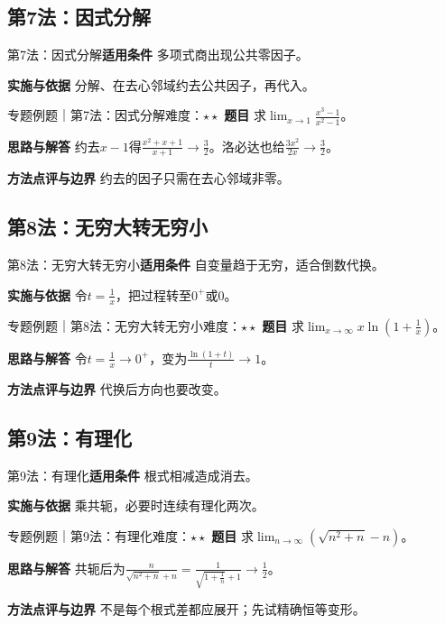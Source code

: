\subsection{第7法：因式分解}\label{mat:limits_35:k07}
\begin{method}{第7法：因式分解}\textbf{适用条件} 多项式商出现公共零因子。\par\textbf{实施与依据} 分解、在去心邻域约去公共因子，再代入。\end{method}
\begin{example}{专题例题｜第7法：因式分解}{难度：$\star\star$}
\textbf{题目} 求$\lim_{x\to1}\frac{x^3-1}{x^2-1}$。\par\textbf{思路与解答} 约去$x-1$得$\frac{x^2+x+1}{x+1}\to\frac{3}{2}$。洛必达也给$\frac{3x^2}{2x}\to\frac{3}{2}$。\par\textbf{方法点评与边界} 约去的因子只需在去心邻域非零。
\end{example}
\subsection{第8法：无穷大转无穷小}\label{mat:limits_35:k08}
\begin{method}{第8法：无穷大转无穷小}\textbf{适用条件} 自变量趋于无穷，适合倒数代换。\par\textbf{实施与依据} 令$t=\frac{1}{x}$，把过程转至$0^+$或$0$。\end{method}
\begin{example}{专题例题｜第8法：无穷大转无穷小}{难度：$\star\star$}
\textbf{题目} 求$\lim_{x\to\infty}x\ln(1+\frac{1}{x})$。\par\textbf{思路与解答} 令$t=\frac{1}{x}\to0^+$，变为$\frac{\ln(1+t)}{t}\to1$。\par\textbf{方法点评与边界} 代换后方向也要改变。
\end{example}
\subsection{第9法：有理化}\label{mat:limits_35:k09}
\begin{method}{第9法：有理化}\textbf{适用条件} 根式相减造成消去。\par\textbf{实施与依据} 乘共轭，必要时连续有理化两次。\end{method}
\begin{example}{专题例题｜第9法：有理化}{难度：$\star\star$}
\textbf{题目} 求$\lim_{n\to\infty}(\sqrt{n^2+n}-n)$。\par\textbf{思路与解答} 共轭后为$\frac{n}{\sqrt{n^2+n}+n}=\frac{1}{\sqrt{1+\frac{1}{n}}+1}\to\frac{1}{2}$。\par\textbf{方法点评与边界} 不是每个根式差都应展开；先试精确恒等变形。
\end{example}
